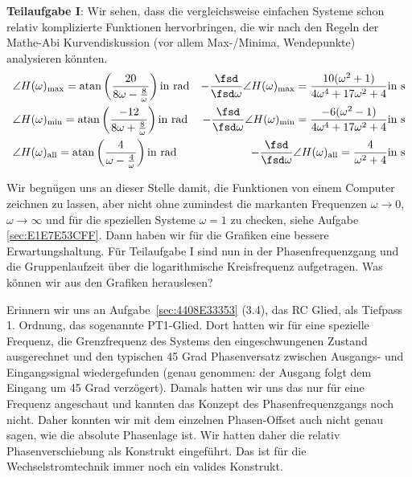 \begin{Loesung}
\textbf{Teilaufgabe I}: Wir sehen, dass die vergleichsweise einfachen Systeme
schon relativ  komplizierte Funktionen hervorbringen, die wir nach den Regeln der
Mathe-Abi Kurvendiskussion (vor allem Max-/Minima, Wendepunkte) analysieren könnten.
%
\begin{align}
&\angle H(\omega)_\mathrm{max} =
\mathrm{atan}\left(\frac{20}{8\omega-\frac{8}{\omega}}\right)\text{in rad}
&-\frac{\fsd}{\fsd \omega} \angle H(\omega)_\mathrm{max}=
\frac{10(\omega^2+1)}{4\omega^4+17\omega^2+4}\text{in s}
\\
&\angle H(\omega)_\mathrm{min} =
\mathrm{atan}\left(\frac{-12}{8\omega+\frac{8}{\omega}}\right)\text{in rad}
&-\frac{\fsd}{\fsd \omega} \angle H(\omega)_\mathrm{min}=
\frac{-6(\omega^2-1)}{4\omega^4+17\omega^2+4}\text{in s}
\\
&\angle H(\omega)_\mathrm{all} =
\mathrm{atan}\left(\frac{4}{\omega-\frac{4}{\omega}}\right)\text{in rad}
&-\frac{\fsd}{\fsd \omega} \angle H(\omega)_\mathrm{all}=
\frac{4}{\omega^2+4}\text{in s}
\end{align}
%

Wir begnügen uns an dieser Stelle damit, die Funktionen von einem Computer zeichnen
zu lassen, aber nicht ohne zumindest die markanten Frequenzen $\omega\to 0$,
$\omega\to \infty$ und für die speziellen Systeme $\omega = 1$ zu checken, siehe
Aufgabe \ref{sec:E1E7E53CFF}. Dann haben wir für die Grafiken eine
bessere Erwartungshaltung.
%
Für Teilaufgabe I sind nun in
 der Phasenfrequenzgang
und die Gruppenlaufzeit über die logarithmische Kreisfrequenz aufgetragen.
%
Was können wir aus den Grafiken herauslesen?

Erinnern wir uns an Aufgabe~\ref{sec:4408E33353} (3.4),
das RC Glied, als Tiefpass 1. Ordnung, das sogenannte PT1-Glied.
Dort hatten wir für eine spezielle Frequenz, die Grenzfrequenz des Systems
den eingeschwungenen Zustand ausgerechnet und den typischen 45 Grad Phasenversatz
zwischen Ausgangs- und Eingangssignal wiedergefunden (genau genommen: der Ausgang
folgt dem Eingang um 45 Grad verzögert). Damals hatten wir uns das nur für
eine Frequenz angeschaut und kannten das Konzept des Phasenfrequenzgangs noch
nicht. Daher konnten wir mit dem einzelnen Phasen-Offset auch nicht genau sagen,
wie die absolute Phasenlage ist. Wir hatten daher die relativ Phasenverschiebung
als Konstrukt eingeführt. Das ist für die Wechselstromtechnik immer noch
ein valides Konstrukt.


\end{Loesung}

